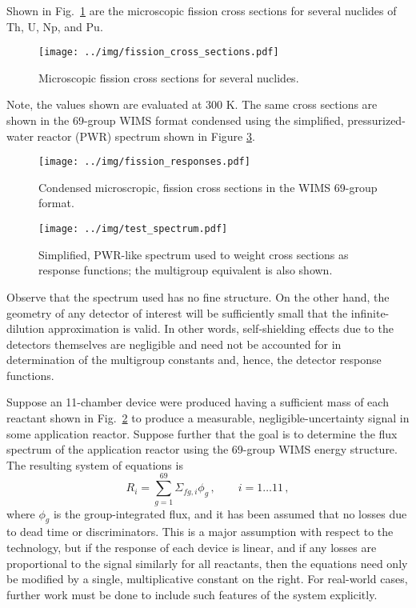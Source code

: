 \documentclass[journal]{IEEEtran}
\newcommand{\FIG}[1]{Fig.~\ref{#1}}               %
\begin{document}
Shown in \FIG{fig:reactants} are the microscopic fission cross sections for several nuclides of Th, U, Np, and Pu.  
\begin{figure}[h!tb]
  \centering
  \texttt{[image: ../img/fission\_cross\_sections.pdf]}
  \caption{Microscopic fission cross sections for several nuclides.}
  \label{fig:reactants}
\end{figure}
Note, the values shown are evaluated at 300 K.  The same cross sections are shown in the 69-group WIMS \cite{stammler1984methods} format condensed using the simplified, pressurized-water reactor (PWR)  spectrum shown in Figure \ref{fig:spectra}.
\begin{figure}[h!tb]
  \centering
  \texttt{[image: ../img/fission\_responses.pdf]}
  \caption{Condensed microscropic, fission cross sections  in the WIMS 69-group format.}
  \label{fig:response}
\end{figure}
\begin{figure}[h!tb]
  \centering
  \texttt{[image: ../img/test\_spectrum.pdf]}
  \caption{Simplified, PWR-like spectrum used to weight cross sections as response functions; the multigroup equivalent is also shown.}
  \label{fig:spectra}
\end{figure}
Observe that the spectrum used has no fine structure.  On the other hand, the geometry of any detector of interest will be sufficiently small that the infinite-dilution approximation is valid.  In other words, self-shielding effects due to the detectors themselves are negligible and need not be accounted for in determination of the multigroup constants and, hence, the detector response functions.

Suppose an 11-chamber device were produced having a sufficient mass of each reactant shown in \FIG{fig:response} to produce a measurable, negligible-uncertainty signal in some application reactor.  Suppose further that the goal is to determine the flux spectrum of the application reactor using the 69-group WIMS energy structure.  The resulting system of equations is 
\begin{equation}
  R_i = \sum_{g=1}^{69} \Sigma_{fg,i}  \phi_g\, , 
    \qquad i = 1 \ldots 11 \, ,
\label{eq:response}
\end{equation}
where $\phi_g$ is the group-integrated flux, and it has been assumed that no losses due to dead time or discriminators.  This is a major assumption with respect to the technology, but if the response of each device is linear, and if any losses are proportional to the signal similarly for all reactants, then the equations need only be modified by a single, multiplicative constant on the right.  For real-world cases, further work must be done to include such features of the system explicitly.
\end{document}
